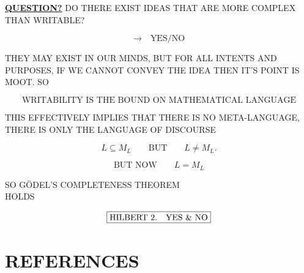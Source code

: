 \documentclass[12pt]{article}
\begin{document}
    \textbf{\underline{QUESTION?}} DO THERE EXIST IDEAS THAT ARE MORE COMPLEX THAN
    WRITABLE?

    \[
        \longrightarrow\quad \text{YES/NO}
    \]

    THEY MAY EXIST IN OUR MINDS, BUT FOR ALL INTENTS AND PURPOSES, IF WE CANNOT
    CONVEY THE IDEA THEN IT'S POINT IS MOOT. SO

    \[
        \boxed{\text{WRITABILITY IS THE BOUND ON MATHEMATICAL LANGUAGE}}
    \]

    THIS EFFECTIVELY IMPLIES THAT THERE IS NO META-LANGUAGE, THERE IS ONLY THE
    LANGUAGE OF DISCOURSE

    \[
        L\subseteq M_L
        \qquad\text{BUT}\qquad
        L\ne M_L.
    \]

    \[
        \text{BUT NOW}\qquad L=M_L
    \]

    \begin{center}
        SO G\"ODEL'S COMPLETENESS THEOREM\\
        HOLDS
    \end{center}

    \begin{center}
    \end{center}

    \[
        \boxed{\text{HILBERT 2.\quad YES \& NO}}
    \]

    \clearpage
    \section*{REFERENCES}
\end{document}
